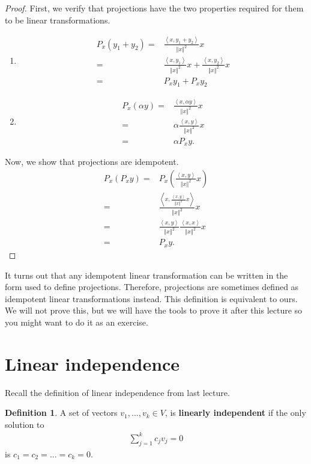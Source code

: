 \documentclass[12pt,reqno]{amsart}
\theoremstyle{definition}
\newtheorem{definition}{Definition}[section]
\newcommand{\iprod}[2]{\left\langle {#1} , {#2} \right\rangle}
\newcommand{\norm}[1]{\left\Vert {#1} \right\Vert}
\begin{document}
\begin{proof}
  First, we verify that projections have the two properties required
  for them to be linear transformations.
  \begin{enumerate}
  \item \begin{align*}
      P_x (y_1 + y_2) = & \frac{\iprod{x}{y_1+y_2}}{\norm{x}^2} x \\
      = & \frac{\iprod{x}{y_1}}{\norm{x}^2} x +
      \frac{\iprod{x}{y_2}}{\norm{x}^2}x   \\
      = & P_x y_1 + P_x y_2 
    \end{align*}
  \item \begin{align*}
      P_x(\alpha y) = & \frac{\iprod{x}{\alpha y}}{\norm{x}^2} x \\
      =& \alpha \frac{\iprod{x}{y}}{\norm{x}^2} x \\
      = & \alpha P_x y.
    \end{align*}
  \end{enumerate}
  Now, we show that projections are idempotent. 
  \begin{align*}
    P_x (P_x y) = & P_x\left(\frac{\iprod{x}{y}}{\norm{x}^2} x \right)
    \\
    = & \frac{\iprod{x}{\frac{\iprod{x}{y}}{\norm{x}^2} x}}{\norm{x}^2} x \\
    = & \frac{\iprod{x}{y}}{\norm{x}^2}
    \frac{\iprod{x}{x}}{\norm{x}^2} x \\
    = & P_x y.
  \end{align*}
\end{proof}
It turns out that any idempotent linear transformation can be written
in the form used to define projections. Therefore, projections are
sometimes defined as idempotent linear transformations instead. This
definition is equivalent to ours. We will not prove this, but we will
have the tools to prove it after this lecture so you might want to do
it as an exercise.

\section{Linear independence}

Recall the definition of linear independence from last lecture. 
\begin{definition}
  A set of vectors $v_1, ..., v_k \in V$, is \textbf{linearly
    independent} if the only solution to
  \begin{align*}
    \sum_{j=1}^k c_j v_j = 0 
  \end{align*}
  is $c_1 = c_2 = ... = c_k = 0$. 
\end{definition}
\end{document}
